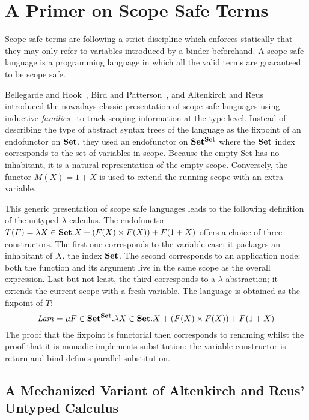 \section{A Primer on Scope Safe Terms}\label{section:primer-term}

Scope safe terms are following a strict discipline which enforces statically
that they may only refer to variables introduced by a binder beforehand. A
scope safe language is a programming language in which all the valid terms
are guaranteed to be scope safe.

Bellegarde and Hook~\citeyear{BELLEGARDE1994287}, Bird and Patterson~\citeyear{bird_paterson_1999},
and Altenkirch and Reus~\citeyear{altenkirch1999monadic} introduced the
nowadays classic presentation of scope safe languages using inductive
\emph{families}~\cite{dybjer1994inductive} to track scoping information
at the type level. Instead of describing the type of abstract syntax trees
of the language as the fixpoint of an endofunctor on $\mathbf{Set}{}$, they used
an endofunctor on $\mathbf{Set}{}^{\mathbf{Set}{}}$ where the $\mathbf{Set}{}$ index corresponds
to the set of variables in scope. Because the empty Set has no inhabitant,
it is a natural representation of the empty scope. Conversely, the functor
$M(X) = 1 + X$ is used to extend the running scope with an extra variable.

This generic presentation of scope safe languages leads to the following
definition of the untyped $\lambda$-calculus. The endofunctor
$T(F) = \lambda X \in \mathbf{Set}{}. X + (F(X) \times F(X)) + F(1 + X)$
offers a choice of three constructors. The first one corresponds to the variable
case; it packages an inhabitant of $X$, the index $\mathbf{Set}{}$. The second corresponds
to an application node; both the function and its argument live in the same
scope as the overall expression. Last but not least, the third corresponds to
a $\lambda$-abstraction; it extends the current scope with a fresh variable.
The language is obtained as the fixpoint of $T$:
\[
   \mathit{Lam} = \mu F \in \mathbf{Set}{}^{\mathbf{Set}{}}.
   \lambda X \in \mathbf{Set}{}. X + (F(X) \times F(X)) + F(1 + X)
\]
The proof that the fixpoint is functorial then corresponds to renaming
whilst the proof that it is monadic implements substitution: the variable
constructor is return and bind defines parallel substitution.

\subsection{A Mechanized Variant of Altenkirch and Reus' Untyped Calculus}

